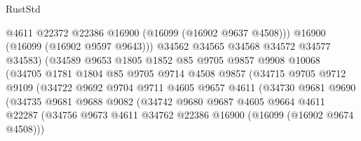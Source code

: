 \begin{lexlean}{RustStd}
\begin{coremodule}
                                  @4611
                                  @22372
                                  @22386
                                  @16900
                                  (@16099 (@16902 @9637 @4508)))
                                @16900
                                (@16099 (@16902 @9597 @9643)))
                              @34562
                              @34565
                              @34568
                              @34572
                              @34577
                              @34583)
                            (@34589
                              @9653
                              @1805
                              @1852
                              @85
                              @9705
                              @9857
                              @9908
                              @10068
                              (@34705
                                @1781
                                @1804
                                @85
                                @9705
                                @9714
                                @4508
                                @9857
                                (@34715
                                  @9705
                                  @9712
                                  @9109
                                  (@34722
                                    @9692
                                    @9704
                                    @9711
                                    @4605
                                    @9657
                                    @4611
                                    (@34730
                                      @9681
                                      @9690
                                      (@34735
                                        @9681
                                        @9688
                                        @9082
                                        (@34742
                                          @9680
                                          @9687
                                          @4605
                                          @9664
                                          @4611
                                          @22287
                                          (@34756
                                            @9673
                                            @4611
                                            @34762
                                            @22386
                                            @16900
                                            (@16099 (@16902 @9674 @4508)))

\end{coremodule}
\end{lexlean}
